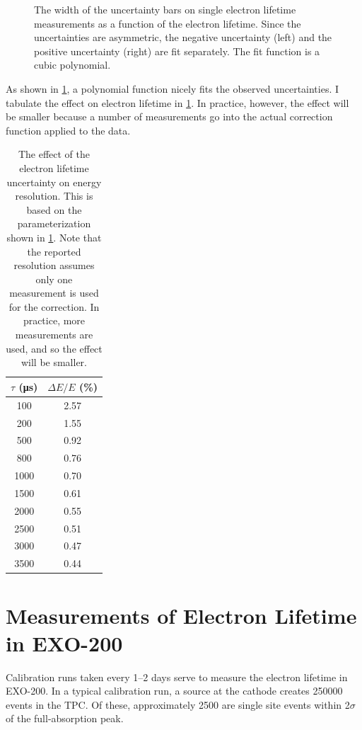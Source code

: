 \documentclass[herrin-thesis.tex]{subfiles}
\begin{document}
\begin{figure}[htbp]
\begin{subfigure}[b]{0.5\linewidth}
\end{subfigure}
\caption[Fits to errors on electron lifetime measurements]{The width of the uncertainty bars on single electron lifetime measurements as a function of the electron lifetime. Since the uncertainties  are asymmetric, the negative uncertainty (left) and the positive uncertainty (right) are fit separately. The fit function is a cubic polynomial.}
\label{fig:err_fits}
\end{figure}

As shown in \cref{fig:err_fits}, a polynomial function nicely fits the observed uncertainties. I tabulate the effect on electron lifetime in \cref{tab:res_dtau}. In practice, however, the effect will be smaller because a number of measurements go into the actual correction function applied to the data.

\begin{table}[htdp]
\centering
\begin{tabular}{c|c}
	\(\tau\) (\si{\micro\second})	&	\(\Delta E / E\) (\%) 	\\ \hline
	100					&	2.57				\\
	200					&	1.55				\\
	500					&	0.92				\\
	800					&	0.76				\\
	1000					&	0.70				\\
	1500					&	0.61				\\
	2000					&	0.55				\\
	2500					&	0.51				\\
	3000					&	0.47				\\
	3500					&	0.44
\end{tabular}
\caption[Electron lifetime uncertainty effect on resolution]{The effect of the electron lifetime uncertainty on energy resolution. This is based on the parameterization shown in \cref{fig:err_fits}. Note that the reported resolution assumes only one measurement is used for the correction. In practice, more measurements are used, and so the effect will be smaller.}
\label{tab:res_dtau}
\end{table}

\section{Measurements of Electron Lifetime in EXO-200}

Calibration runs taken every 1--2 days serve to measure the electron lifetime in EXO-200. In a typical calibration run, a  source at the cathode creates 250000 events in the TPC. Of these, approximately 2500 are single site events within 2\(\sigma\) of the full-absorption peak.
\end{document}
